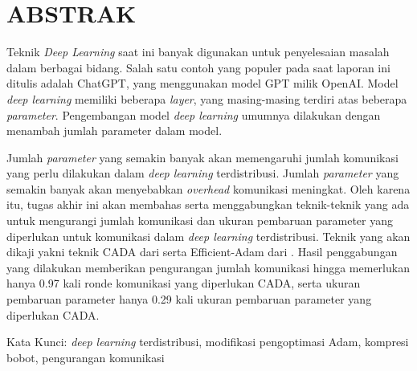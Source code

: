 \clearpage
\chapter*{ABSTRAK}

Teknik \emph{Deep Learning} saat ini banyak digunakan untuk penyelesaian masalah dalam berbagai bidang. Salah satu contoh yang populer pada saat laporan ini ditulis adalah ChatGPT, yang menggunakan model GPT milik OpenAI. Model \emph{deep learning} memiliki beberapa \emph{layer}, yang masing-masing terdiri atas beberapa \emph{parameter}. Pengembangan model \emph{deep learning} umumnya dilakukan dengan menambah jumlah parameter dalam model.

Jumlah \emph{parameter} yang semakin banyak akan memengaruhi jumlah komunikasi yang perlu dilakukan dalam \emph{deep learning} terdistribusi. Jumlah \emph{parameter} yang semakin banyak akan menyebabkan \emph{overhead} komunikasi meningkat. Oleh karena itu, tugas akhir ini akan membahas serta menggabungkan teknik-teknik yang ada untuk mengurangi jumlah komunikasi dan ukuran pembaruan parameter yang diperlukan untuk komunikasi dalam \emph{deep learning} terdistribusi. Teknik yang akan dikaji yakni teknik CADA dari \textcite{Chen2021CADA} serta Efficient-Adam dari \textcite{Chen2022Efficient}. Hasil penggabungan yang dilakukan memberikan pengurangan jumlah komunikasi hingga memerlukan hanya 0.97 kali ronde komunikasi yang diperlukan CADA, serta ukuran pembaruan parameter hanya 0.29 kali ukuran pembaruan parameter yang diperlukan CADA.

Kata Kunci: \emph{deep learning} terdistribusi, modifikasi pengoptimasi Adam, kompresi bobot, pengurangan komunikasi
\clearpage
